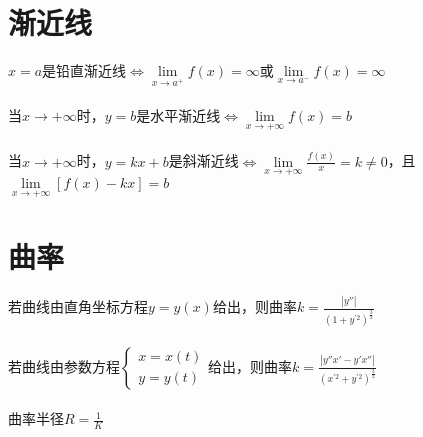 \documentclass{article}
\begin{document}
\begin{flushleft}
	\section{渐近线}
	
	$x=a$是铅直渐近线$\Leftrightarrow \lim\limits_{x\to a^+}f(x)=\infty$或$\lim\limits_{x\to a^-}f(x)=\infty$\\
	~\\
	当$x\to +\infty$时，$y=b$是水平渐近线$\Leftrightarrow \lim\limits_{x\to +\infty}f(x)=b$\\
	~\\
	当$x\to +\infty$时，$y=kx+b$是斜渐近线$\Leftrightarrow \lim\limits_{x\to +\infty}\frac{f(x)}{x}=k\neq 0$，且$\lim\limits_{x\to +\infty}[f(x)-kx]=b$\\
	
	\section{曲率}
	
	若曲线由直角坐标方程$y=y(x)$给出，则曲率$k=\frac{|y''|}{(1+y^{'2})^{\frac{3}{2}}}$\\
	~\\
	若曲线由参数方程$\left\{
	\begin{array}{rcl}
	x=x(t)\\
	y=y(t)
	\end{array} \right.$给出，则曲率$k=\frac{|y''x'-y'x''|}{(x^{'2}+y^{'2})^{\frac{3}{2}}}$\\
	~\\
	曲率半径$R=\frac{1}{K}$\\
	
\end{flushleft}
\end{document}

